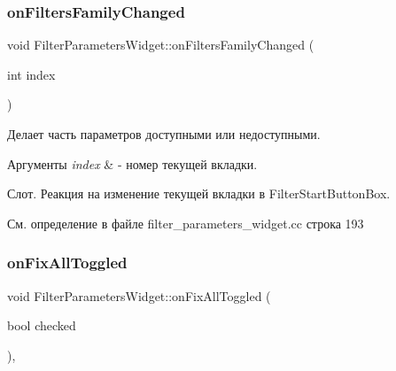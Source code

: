 \hypertarget{class_filter_parameters_widget_a64e5feb9fe8915417d9e753243d74c84}{}\label{class_filter_parameters_widget_a64e5feb9fe8915417d9e753243d74c84} 
\subsubsection{\texorpdfstring{on\+Filters\+Family\+Changed}{onFiltersFamilyChanged}}
{\footnotesize\ttfamily void Filter\+Parameters\+Widget\+::on\+Filters\+Family\+Changed (\begin{DoxyParamCaption}\item[{int}]{index }\end{DoxyParamCaption})\hspace{0.3cm}{\ttfamily [slot]}}



Делает часть параметров доступными или недоступными. 


\begin{DoxyParams}{Аргументы}
{\em index} & -\/ номер текущей вкладки.\\
\hline
\end{DoxyParams}
Слот. Реакция на изменение текущей вкладки в Filter\+Start\+Button\+Box. 

См. определение в файле filter\+\_\+parameters\+\_\+widget.\+cc строка 193

\hypertarget{class_filter_parameters_widget_a6d01e0b6bdb2b38f03a6935fac62a31c}{}\label{class_filter_parameters_widget_a6d01e0b6bdb2b38f03a6935fac62a31c} 
\subsubsection{\texorpdfstring{on\+Fix\+All\+Toggled}{onFixAllToggled}}
{\footnotesize\ttfamily void Filter\+Parameters\+Widget\+::on\+Fix\+All\+Toggled (\begin{DoxyParamCaption}\item[{bool}]{checked }\end{DoxyParamCaption})\hspace{0.3cm}{\ttfamily [private]}, {\ttfamily [slot]}}



